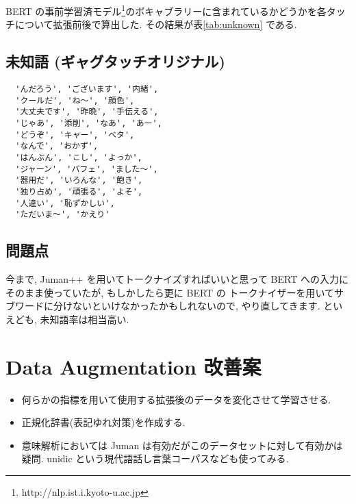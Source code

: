 \documentclass[twocolumn]{jarticle}     %
\begin{document}
BERT の事前学習済モデル\footnote{http://nlp.ist.i.kyoto-u.ac.jp}のボキャブラリーに含まれているかどうかを各タッチについて拡張前後で算出した. その結果が表\ref{tab:unknown} である.

\begin{table}[hb]
\begin{center}
\caption{データセットに含まれる未知語率}
\end{center}
\end{table}

\subsection{未知語 (ギャグタッチオリジナル)}
\begin{verbatim}
  'んだろう', 'ございます', '内緒',
  'クールだ', 'ね〜', '顔色',
  '大丈夫です', '昨晩', '手伝える',
  'じゃあ', '添削', 'なあ', 'あー',
  'どうぞ', 'キャー', 'ベタ',
  'なんで', 'おかず',
  'はんぶん', 'こし', 'よっか',
  'ジャーン', 'パフェ', 'ました〜',
  '器用だ', 'いろんな', '飽き',
  '独り占め', '頑張る', 'よそ',
  '人違い', '恥ずかしい',
  'ただいま〜', 'かえり'
\end{verbatim}

\subsection{問題点}
今まで, Juman++ を用いてトークナイズすればいいと思って BERT への入力にそのまま使っていたが,
もしかしたら更に BERT の トークナイザーを用いてサブワードに分けないといけなかったかもしれないので, やり直してきます.
といえども, 未知語率は相当高い.

\section{Data Augmentation 改善案}
\begin{itemize}
  \item 何らかの指標を用いて使用する拡張後のデータを変化させて学習させる.
  \item 正規化辞書(表記ゆれ対策)を作成する.
  \item 意味解析においては Juman は有効だがこのデータセットに対して有効かは疑問. unidic という現代語話し言葉コーパスなども使ってみる.
\end{itemize}
\end{document}
